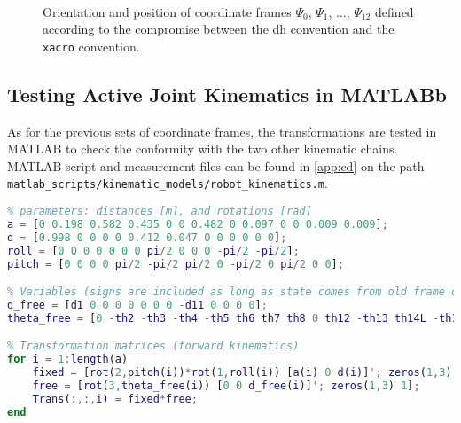 \begin{figure}[htbp]
	\vspace*{-10mm}
	\hspace{-15mm}
	\vspace{5mm}\\
	\hspace*{-15mm}
	\caption{Orientation and position of coordinate frames $\Psi_0$, $\Psi_1$, ..., $\Psi_{12}$ defined according to the compromise between the \gls{dh} convention and the \texttt{xacro} convention.}
	\label{fig:robot_compromise_frames}
\end{figure}

\subsection{Testing Active Joint Kinematics in MATLABb}
As for the previous sets of coordinate frames, the transformations are tested in MATLAB to check the conformity with the two other kinematic chains.
MATLAB script and measurement files can be found in \autoref{app:cd} on the path \texttt{matlab\_scripts/kinematic\_models/robot\_kinematics.m}.

\begin{lstlisting}[language=matlab]
%% Coordinate frames defined as a compromise between DH and the xacro syntax, excluding passive joints
% parameters: distances [m], and rotations [rad]
a = [0 0.198 0.582 0.435 0 0 0.482 0 0.097 0 0 0.009 0.009];
d = [0.998 0 0 0 0 0.412 0.047 0 0 0 0 0 0];
roll = [0 0 0 0 0 0 0 pi/2 0 0 0 -pi/2 -pi/2];
pitch = [0 0 0 0 pi/2 -pi/2 pi/2 0 -pi/2 0 pi/2 0 0];

% Variables (signs are included as long as state comes from old frame convention)
d_free = [d1 0 0 0 0 0 0 0 -d11 0 0 0 0];
theta_free = [0 -th2 -th3 -th4 -th5 th6 th7 th8 0 th12 -th13 th14L -th14R];

% Transformation matrices (forward kinematics)
for i = 1:length(a)
	fixed = [rot(2,pitch(i))*rot(1,roll(i)) [a(i) 0 d(i)]'; zeros(1,3) 1];
	free = [rot(3,theta_free(i)) [0 0 d_free(i)]'; zeros(1,3) 1];
	Trans(:,:,i) = fixed*free;
end
\end{lstlisting}

